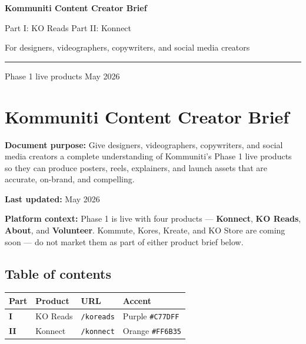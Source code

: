 \documentclass[11pt,a4paper]{report}
\begin{document}
\begin{titlepage}
  \centering
  \vspace*{2cm}
  {\Huge\bfseries\color{KommNavy} Kommuniti Content Creator Brief\par}
  \vspace{1.2cm}
  {\Large Part I: KO Reads \textbar{} Part II: Konnect\par}
  \vspace{0.8cm}
  {\large For designers, videographers, copywriters, and social media creators\par}
  \vfill
  {\color{KommGold}\rule{0.6\textwidth}{1pt}\par}
  \vspace{0.5cm}
  {\small Phase 1 live products \textbar{} May 2026\par}
\end{titlepage}

\tableofcontents
\newpage

\section{Kommuniti Content Creator Brief}

\textbf{Document purpose:} Give designers, videographers, copywriters, and social media creators a complete understanding of Kommuniti's Phase 1 live products so they can produce posters, reels, explainers, and launch assets that are accurate, on-brand, and compelling.


\textbf{Last updated:} May 2026

\textbf{Platform context:} Phase 1 is live with four products --- \textbf{Konnect}, \textbf{KO Reads}, \textbf{About}, and \textbf{Volunteer}. Kommute, Kores, Kreate, and KO Store are coming soon --- do not market them as part of either product brief below.


\subsection{Table of contents}

\begin{longtable}{|l|l|l|l|}
\hline
Part & Product & URL & Accent \\ \hline
\textbf{I} & KO Reads & \texttt{/koreads} & Purple \texttt{\#C77DFF} \\ \hline
\textbf{II} & Konnect & \texttt{/konnect} & Orange \texttt{\#FF6B35} \\
\hline
\end{longtable}
\end{document}

